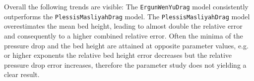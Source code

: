 Overall the following trends are visible: 
The \lstinline|ErgunWenYuDrag| model consistently outperforms the \lstinline|PlessisMasliyahDrag| model.
The \lstinline|PlessisMasliyahDrag| model overestimates the mean bed height, leading to almost double the relative error and consequently to a higher combined relative error.
Often the minima of the pressure drop and the bed height are attained at opposite parameter values, e.g. or higher exponents the relative bed height error decreases but the relative pressure drop error increases, therefore the parameter study does not yielding a clear result.





